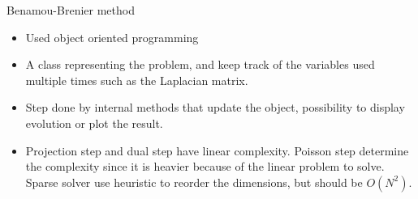 \documentclass{beamer}
\begin{document}
\begin{frame}{Benamou-Brenier method}
\begin{itemize}
    \item Used object oriented programming
    \item A class representing the problem, and keep track of the variables used multiple times such as the Laplacian matrix.
    \item Step done by internal methods that update the object, possibility to display evolution or plot the result.
    \item Projection step and dual step have linear complexity. Poisson step determine the complexity since it is heavier because of the linear problem to solve. Sparse solver use heuristic to reorder the dimensions, but should be $O(N^2)$.

\end{itemize}
\end{frame}
\end{document}
